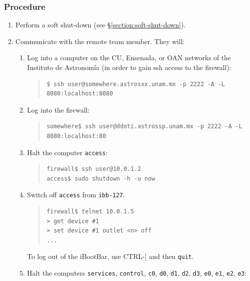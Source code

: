 \subsubsection{Procedure}

\begin{enumerate}
\item Perform a soft shut-down (see \S\ref{section:soft-shut-down}).
\item Communicate with the remote team member. They will:
\begin{enumerate}

   \item Log into a computer on the CU, Ensenada, or OAN networks of the Instituto de Astronomía (in order to gain ssh access to the firewall):
   
\begin{quote}\footnotesize
\begin{verbatim}
$ ssh user@somewhere.astrosxx.unam.mx -p 2222 -A -L 8080:localhost:8080
\end{verbatim}
\end{quote}

    \item Log into the firewall:
\begin{quote}\footnotesize
\begin{verbatim}
somewhere$ ssh user@ddoti.astrossp.unam.mx -p 2222 -A -L 8080:localhost:80
\end{verbatim}
\end{quote}

    \item Halt the computer \verb|access|:

\begin{quote}\footnotesize
\begin{verbatim}
firewall$ ssh user@10.0.1.2
access$ sudo shutdown -h -u now
\end{verbatim}
\end{quote}
    
    \item Switch off \verb|access| from \verb|ibb-127|.
\begin{quote}\footnotesize
\begin{verbatim}
firewall$ telnet 10.0.1.5
> get device #1
> set device #1 outlet <n> off
...
\end{verbatim}
\end{quote}
To log out of the iBootBar, use CTRL-] and then \verb|quit|.

    \item Halt the computers \verb|services|, \verb|control|, \verb|c0|, \verb|d0|, \verb|d1|, \verb|d2|, \verb|d3|, \verb|e0|, \verb|e1|, \verb|e2|, \verb|e3|:


\end{enumerate}
\end{enumerate}
